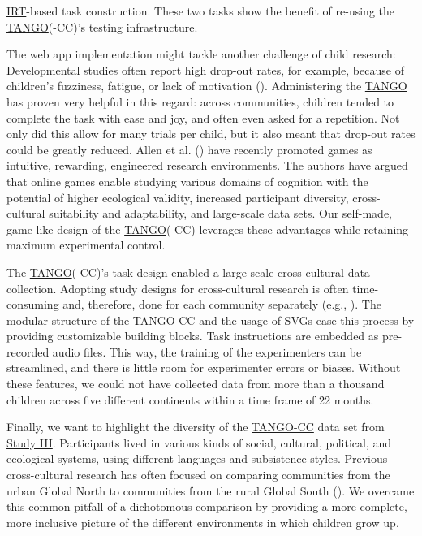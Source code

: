 \documentclass[
]{scrbook}
\begin{document}
\hyperref[acronyms_IRT]{IRT}-based task construction. These two tasks show the benefit of re-using the \hyperref[acronyms_TANGO]{TANGO}(-CC)'s testing infrastructure.

The web app implementation might tackle another challenge of child research: Developmental studies often report high drop-out rates, for example, because of children's fuzziness, fatigue, or lack of motivation (). Administering the \hyperref[acronyms_TANGO]{TANGO} has proven very helpful in this regard: across communities, children tended to complete the task with ease and joy, and often even asked for a repetition. Not only did this allow for many trials per child, but it also meant that drop-out rates could be greatly reduced. Allen et al. () have recently promoted games as intuitive, rewarding, engineered research environments. The authors have argued that online games enable studying various domains of cognition with the potential of higher ecological validity, increased participant diversity, cross-cultural suitability and adaptability, and large-scale data sets. Our self-made, game-like design of the \hyperref[acronyms_TANGO]{TANGO}(-CC) leverages these advantages while retaining maximum experimental control.

The \hyperref[acronyms_TANGO]{TANGO}(-CC)'s task design enabled a large-scale cross-cultural data collection. Adopting study designs for cross-cultural research is often time-consuming and, therefore, done for each community separately (e.g., ). The modular structure of the \hyperref[acronyms_TANGO-CC]{TANGO-CC} and the usage of \hyperref[acronyms_SVG]{SVG}s ease this process by providing customizable building blocks. Task instructions are embedded as pre-recorded audio files. This way, the training of the experimenters can be streamlined, and there is little room for experimenter errors or biases. Without these features, we could not have collected data from more than a thousand children across five different continents within a time frame of 22 months.

Finally, we want to highlight the diversity of the \hyperref[acronyms_TANGO-CC]{TANGO-CC} data set from \hyperref[studyIII]{Study III}. Participants lived in various kinds of social, cultural, political, and ecological systems, using different languages and subsistence styles. Previous cross-cultural research has often focused on comparing communities from the urban Global North to communities from the rural Global South (). We overcame this common pitfall of a dichotomous comparison by providing a more complete, more inclusive picture of the different environments in which children grow up.
\end{document}
